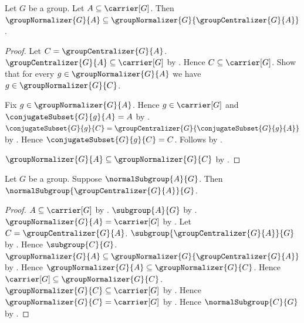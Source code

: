 \begin{theorem}\label{group_normalizer_subseteq_centralizer_normalizer}
    Let $G$ be a group.
    Let $A\subseteq\carrier[G]$.
    Then
        $\groupNormalizer{G}{A}\subseteq
        \groupNormalizer{G}{\groupCentralizer{G}{A}}$.
\end{theorem}
\begin{proof}
    Let $C=\groupCentralizer{G}{A}$.
    $\groupCentralizer{G}{A}\subseteq\carrier[G]$ by
        .
    Hence $C\subseteq\carrier[G]$.
    Show that for every $g\in\groupNormalizer{G}{A}$ we have
        $g\in\groupNormalizer{G}{C}$.
    \begin{subproof}
        Fix $g\in\groupNormalizer{G}{A}$.
        Hence $g\in\carrier[G]$ and
            $\conjugateSubset{G}{g}{A}=A$ by
            .
        $\conjugateSubset{G}{g}{C}=
            \groupCentralizer{G}{\conjugateSubset{G}{g}{A}}$ by
            .
        Hence $\conjugateSubset{G}{g}{C}=C$.
        Follows by .
    \end{subproof}
    $\groupNormalizer{G}{A}\subseteq\groupNormalizer{G}{C}$ by
        .
\end{proof}

\begin{corollary}\label{normal_subgroup_centralizer_normal}
    Let $G$ be a group.
    Suppose $\normalSubgroup{A}{G}$.
    Then $\normalSubgroup{\groupCentralizer{G}{A}}{G}$.
\end{corollary}
\begin{proof}
    $A\subseteq\carrier[G]$ by .
    $\subgroup{A}{G}$ by .
    $\groupNormalizer{G}{A}=\carrier[G]$ by
        .
    Let $C=\groupCentralizer{G}{A}$.
    $\subgroup{\groupCentralizer{G}{A}}{G}$ by
        .
    Hence $\subgroup{C}{G}$.
    $\groupNormalizer{G}{A}\subseteq
        \groupNormalizer{G}{\groupCentralizer{G}{A}}$ by
        .
    Hence $\groupNormalizer{G}{A}\subseteq
        \groupNormalizer{G}{C}$.
    Hence $\carrier[G]\subseteq\groupNormalizer{G}{C}$.
    $\groupNormalizer{G}{C}\subseteq\carrier[G]$ by
        .
    Hence $\groupNormalizer{G}{C}=\carrier[G]$ by
        .
    Hence $\normalSubgroup{C}{G}$ by
        .
\end{proof}
